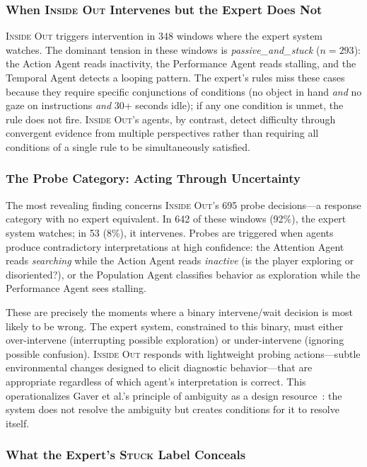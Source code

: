 \subsubsection{When \textsc{Inside Out} Intervenes but the Expert Does Not}

\textsc{Inside Out} triggers intervention in 348 windows where the expert system watches. The dominant tension in these windows is \emph{passive\_and\_stuck} ($n = 293$): the Action Agent reads inactivity, the Performance Agent reads stalling, and the Temporal Agent detects a looping pattern. The expert's rules miss these cases because they require specific conjunctions of conditions (no object in hand \emph{and} no gaze on instructions \emph{and} 30+ seconds idle); if any one condition is unmet, the rule does not fire. \textsc{Inside Out}'s agents, by contrast, detect difficulty through convergent evidence from multiple perspectives rather than requiring all conditions of a single rule to be simultaneously satisfied.

\subsubsection{The Probe Category: Acting Through Uncertainty}

The most revealing finding concerns \textsc{Inside Out}'s 695 probe decisions---a response category with no expert equivalent. In 642 of these windows (92\%), the expert system watches; in 53 (8\%), it intervenes. Probes are triggered when agents produce contradictory interpretations at high confidence: the Attention Agent reads \emph{searching} while the Action Agent reads \emph{inactive} (is the player exploring or disoriented?), or the Population Agent classifies behavior as exploration while the Performance Agent sees stalling.

These are precisely the moments where a binary intervene/wait decision is most likely to be wrong. The expert system, constrained to this binary, must either over-intervene (interrupting possible exploration) or under-intervene (ignoring possible confusion). \textsc{Inside Out} responds with lightweight probing actions---subtle environmental changes designed to elicit diagnostic behavior---that are appropriate regardless of which agent's interpretation is correct. This operationalizes Gaver et al.'s principle of ambiguity as a design resource~\cite{gaver2003ambiguity}: the system does not resolve the ambiguity but creates conditions for it to resolve itself.

\subsubsection{What the Expert's \textsc{Stuck} Label Conceals}


